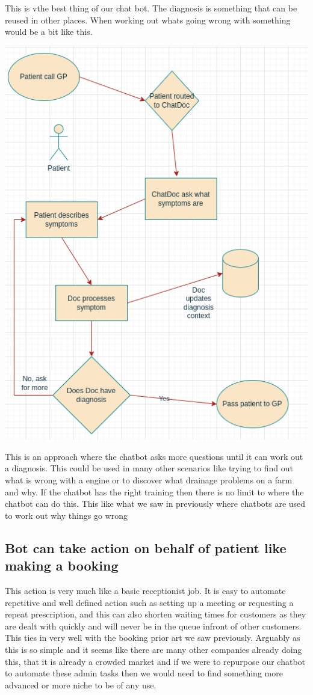 \documentclass{article}
\begin{document}
This is vthe best thing of our chat bot. The diagnosis is something that can be reused in other places. 
When working out whats going wrong with something would be a bit like this.
\begin{center} 
\includegraphics[scale=0.5]{PatientFlow}
\end{center}
This is an approach where the chatbot asks more questions until it can work out a diagnosis. 
This could be used in many other scenarios like trying to find out what is wrong with a engine or to discover what drainage problems on a farm and why. If the chatbot has the right training then there is no limit to where the chatbot can do this. This like what we saw in previously where chatbots are used to work out why things go wrong\cite{gyan}\cite{devops}

\subsection{Bot can take action on behalf of patient like making a booking}
This action is very much like a basic receptionist job. It is easy to automate repetitive and well defined action such as setting up a meeting or requesting a repeat prescription, and this can also shorten waiting times for customers as they are dealt with quickly and will never be in the queue infront of other customers. This ties in very well with the booking prior art we saw previously. Arguably as this is so simple and it seems like there are many other companies already doing this, that it is already a crowded market and if we were to repurpose our chatbot to automate these admin tasks then we would need to find something more advanced or more niche to be of any use.
\end{document}
